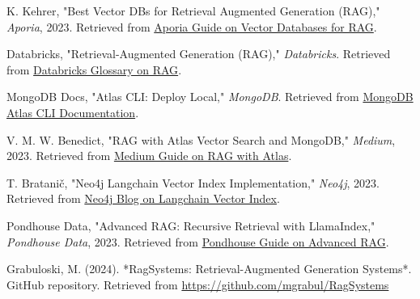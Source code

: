 \documentclass{wseas}
\begin{document}
\begin{thebibliography}{9}
   K. Kehrer, "Best Vector DBs for Retrieval Augmented Generation (RAG)," \textit{Aporia}, 2023. Retrieved from \href{https://www.aporia.com/learn/best-vector-dbs-for-retrieval-augmented-generation-rag/}{Aporia Guide on Vector Databases for RAG}.
  
   Databricks, "Retrieval-Augmented Generation (RAG)," \textit{Databricks}. Retrieved from \href{https://www.databricks.com/glossary/retrieval-augmented-generation-rag}{Databricks Glossary on RAG}.
  
  MongoDB Docs, "Atlas CLI: Deploy Local," \textit{MongoDB}. Retrieved from \href{https://www.mongodb.com/docs/atlas/cli/current/atlas-cli-deploy-local/}{MongoDB Atlas CLI Documentation}.
  
   V. M. W. Benedict, "RAG with Atlas Vector Search and MongoDB," \textit{Medium}, 2023. Retrieved from \href{https://medium.com/@if-21062/rag-with-atlas-vector-search-mongodb-0d2420e00b64}{Medium Guide on RAG with Atlas}.
  
   T. Bratanič, "Neo4j Langchain Vector Index Implementation," \textit{Neo4j}, 2023. Retrieved from \href{https://neo4j.com/developer-blog/neo4j-langchain-vector-index-implementation/}{Neo4j Blog on Langchain Vector Index}.
  
   Pondhouse Data, "Advanced RAG: Recursive Retrieval with LlamaIndex," \textit{Pondhouse Data}, 2023. Retrieved from \href{https://www.pondhouse-data.com/blog/advanced-rag-recursive-retrieval-with-llamaindex}{Pondhouse Guide on Advanced RAG}.
  
   Grabuloski, M. (2024). *RagSystems: Retrieval-Augmented Generation Systems*. GitHub repository. Retrieved from \url{https://github.com/mgrabul/RagSystems}


\end{thebibliography}
\end{document}
